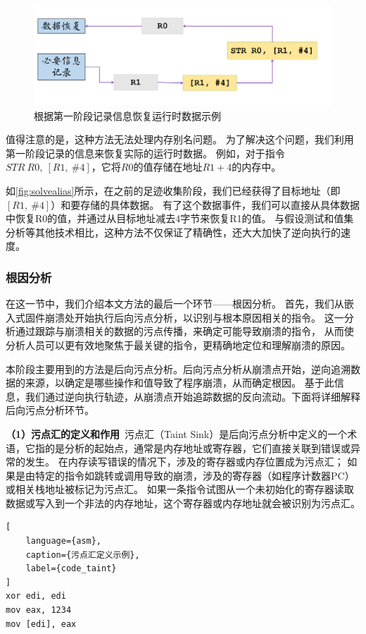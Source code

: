 \begin{figure}[h]
    \centering
    \includegraphics[width=1.0\textwidth]{./figure/solvealias.png}
    \caption{根据第一阶段记录信息恢复运行时数据示例}
    \label{fig:solvealias}
\end{figure}

值得注意的是，这种方法无法处理内存别名问题。
为了解决这个问题，我们利用第一阶段记录的信息来恢复实际的运行时数据。
例如，对于指令$STR\ R0,\ [R1,\ \#4]$，它将$R0$的值存储在地址$R1+4$的内存中。

如\autoref{fig:solvealias}所示，在之前的足迹收集阶段，我们已经获得了目标地址（即$[R1,\ \#4]$）和要存储的具体数据。
有了这个数据事件，我们可以直接从具体数据中恢复R0的值，并通过从目标地址减去4字节来恢复R1的值。
与假设测试和值集分析等其他技术相比，这种方法不仅保证了精确性，还大大加快了逆向执行的速度。
\subsubsection{根因分析}
在这一节中，我们介绍本文方法的最后一个环节——根因分析。
首先，我们从嵌入式固件崩溃处开始执行后向污点分析，以识别与根本原因相关的指令。
这一分析通过跟踪与崩溃相关的数据的污点传播，来确定可能导致崩溃的指令，
从而使分析人员可以更有效地聚焦于最关键的指令，更精确地定位和理解崩溃的原因。

本阶段主要用到的方法是后向污点分析。后向污点分析从崩溃点开始，逆向追溯数据的来源，以确定是哪些操作和值导致了程序崩溃，从而确定根因。
基于此信息，我们通过逆向执行轨迹，从崩溃点开始追踪数据的反向流动。下面将详细解释后向污点分析环节。

\textbf{（1）污点汇的定义和作用}\ 
污点汇（Taint Sink）是后向污点分析中定义的一个术语，它指的是分析的起始点，通常是内存地址或寄存器，它们直接关联到错误或异常的发生。
在内存读写错误的情况下，涉及的寄存器或内存位置成为污点汇；
如果是由特定的指令如跳转或调用导致的崩溃，涉及的寄存器（如程序计数器PC）或相关栈地址被标记为污点汇。
如果一条指令试图从一个未初始化的寄存器读取数据或写入到一个非法的内存地址，这个寄存器或内存地址就会被识别为污点汇。

\begin{lstlisting}[
    language={asm},
    caption={污点汇定义示例},
    label={code_taint}
]
xor edi, edi         
mov eax, 1234        
mov [edi], eax      
\end{lstlisting}

